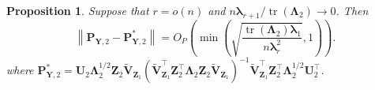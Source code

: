 \documentclass[10pt]{book}
\newtheorem{proposition}{Proposition}
\theoremstyle{definition}
\newtheorem{remark}{Remark}
\DeclareMathOperator{\mytr}{tr}
\DeclareMathOperator{\myrank}{Rank}
\newcommand{\bZ}{\mathbf{Z}}
\newcommand{\bP}{\mathbf{P}}
\newcommand{\bY}{\mathbf{Y}}
\newcommand{\bU}{\mathbf{U}}
\newcommand{\bV}{\mathbf{V}}
\newcommand{\bfsym}[1]{\ensuremath{\boldsymbol{#1}}}
\def\blambda {\bfsym {\lambda}}
\def\bLambda {\bfsym {\Lambda}}
\begin{document}
\begin{proposition}
    \label{eigenvectorprop2}
    Suppose that $r=o(n)$ and $n\blambda_{r+1} /\mytr(\bLambda_2)\to 0$. Then
    \begin{equation*}
            \left\|
            \bP_{\bY,2}
            -
            \bP_{\bY,2}^*
            \right\|
    = 
    O_P\left(
        \min\left(
        \sqrt{\frac{\mytr(\bLambda_2) \blambda_1}{n\blambda_r^2}}
    ,1\right)
    \right)
    .
    \end{equation*}
where
$
            \bP_{\bY,2}^*=
            \bU_2 \bLambda_2^{1/2}\bZ_{2} \tilde{\bV}_{\bZ_1}
            \left(\tilde{\bV}_{\bZ_1}^\top \bZ_2^\top \bLambda_2 \bZ_2 \tilde{\bV}_{\bZ_1}\right)^{-1}
            \tilde{\bV}_{\bZ_1}^\top \bZ_2^\top \bLambda_2^{1/2} \bU_2^\top
            $.
\end{proposition}
\end{document}
